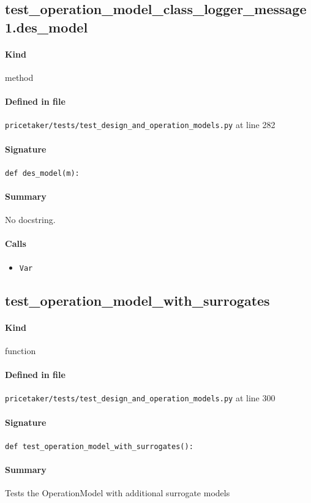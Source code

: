 \documentclass[11pt]{report}
\begin{document}
\subsection{test\_operation\_model\_class\_logger\_message1.des\_model}
\label{def:pricetaker-tests-test_design_and_operation_models.py:test_operation_model_class_logger_message1.des_model:L282}
\paragraph{Kind} method
\paragraph{Defined in file} \texttt{pricetaker/tests/test\_design\_and\_operation\_models.py} at line 282
\paragraph{Signature} \texttt{def des\_model(m):}
\paragraph{Summary} No docstring.
\paragraph{Calls}
\begin{itemize}[leftmargin=*]
  \item \texttt{Var}
\end{itemize}
\subsection{test\_operation\_model\_with\_surrogates}
\label{def:pricetaker-tests-test_design_and_operation_models.py:test_operation_model_with_surrogates:L300}
\paragraph{Kind} function
\paragraph{Defined in file} \texttt{pricetaker/tests/test\_design\_and\_operation\_models.py} at line 300
\paragraph{Signature} \texttt{def test\_operation\_model\_with\_surrogates():}
\paragraph{Summary} Tests the OperationModel with additional surrogate models
\end{document}
